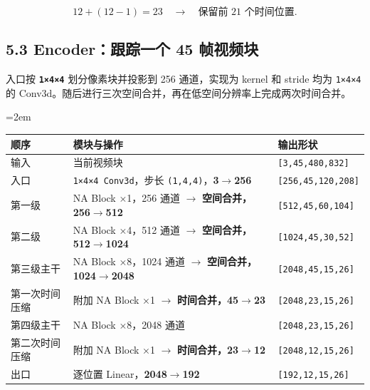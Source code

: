 \documentclass[
  11pt,
  a4paper,
  fontset=none]{ctexart}
\newcounter{none} %
\newcommand{\NotesTableStyle}{\linespread{1}\fontsize{9.5pt}{13pt}\selectfont\setlength{\tabcolsep}{4pt}\renewcommand{\arraystretch}{1.1}\setlength{\extrarowheight}{5pt}\setlength{\LTpre}{5pt}\setlength{\LTpost}{6pt}\setlength{\parskip}{0pt}\emergencystretch=2em}
\begin{document}
\[
12+(12-1)=23
\quad\longrightarrow\quad
\text{保留前 }21\text{ 个时间位置}.
\]


\subsection{5.3 Encoder：跟踪一个 45 帧视频块}\label{flux3-encoder}

入口按 \textbf{\texttt{1×4×4}} 划分像素块并投影到 256 通道，实现为
kernel 和 stride 均为 \texttt{1×4×4} 的
Conv3d。随后进行三次空间合并，再在低空间分辨率上完成两次时间合并。

\begingroup\NotesTableStyle\fontsize{10.5pt}{14pt}\selectfont\renewcommand{\arraystretch}{1.08}\setlength{\extrarowheight}{3pt}

{\def\LTcaptype{none} %
\begin{longtable}[]{@{}
  >{\raggedright\arraybackslash}p{}
  >{\raggedright\arraybackslash}p{}
  >{\raggedright\arraybackslash}p{}@{}}
\toprule\noalign{}
\begin{minipage}[b]{\linewidth}\raggedright
顺序
\end{minipage} & \begin{minipage}[b]{\linewidth}\raggedright
模块与操作
\end{minipage} & \begin{minipage}[b]{\linewidth}\raggedright
输出形状
\end{minipage} \\
\midrule\noalign{}
\endhead
\bottomrule\noalign{}
\endlastfoot
输入 & 当前视频块 & \texttt{{[}3,45,480,832{]}} \\
入口 & \texttt{1×4×4\ Conv3d}，步长
\texttt{(1,4,4)}，\textbf{3\(\rightarrow\)256} &
\texttt{{[}256,45,120,208{]}} \\
第一级 & NA Block ×1，256 通道 \(\rightarrow\)
\textbf{空间合并，256\(\rightarrow\)512} &
\texttt{{[}512,45,60,104{]}} \\
第二级 & NA Block ×4，512 通道 \(\rightarrow\)
\textbf{空间合并，512\(\rightarrow\)1024} &
\texttt{{[}1024,45,30,52{]}} \\
第三级主干 & NA Block ×8，1024 通道 \(\rightarrow\)
\textbf{空间合并，1024\(\rightarrow\)2048} &
\texttt{{[}2048,45,15,26{]}} \\
第一次时间压缩 & 附加 NA Block ×1 \(\rightarrow\)
\textbf{时间合并，45\(\rightarrow\)23} & \texttt{{[}2048,23,15,26{]}} \\
第四级主干 & NA Block ×8，2048 通道 & \texttt{{[}2048,23,15,26{]}} \\
第二次时间压缩 & 附加 NA Block ×1 \(\rightarrow\)
\textbf{时间合并，23\(\rightarrow\)12} & \texttt{{[}2048,12,15,26{]}} \\
出口 & 逐位置 Linear，\textbf{2048\(\rightarrow\)192} &
\texttt{{[}192,12,15,26{]}} \\
\end{longtable}
}
\end{document}

